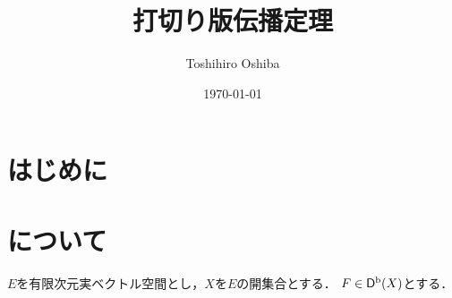 \newcommand{\mucat}[2][]{\mathsf{D}^{\mathrm{b}}_{#1}(#2)}

\newcommand{\conv}[1][]{\mathbin{\mathop{\circ}\limits_{#1}}}


\newcommand{\lopen}{\mathopen{]}}
\newcommand{\lclosed}{\mathopen{[}}
\newcommand{\ropen}{\mathclose{[}}
\newcommand{\rclosed}{\mathopen{]}}

\DeclarePairedDelimiter{\openintvl}{]}{[}     %
\DeclarePairedDelimiter{\closedintvl}{[}{]}       %
\DeclarePairedDelimiter{\lopenrclosedintvl}{]}{]}    %
\DeclarePairedDelimiter{\lcosedropenintvl}{[}{[}    %


\newcommand{\sm}{\raisebox{2.33pt}{~\rule{6.4pt}{1.3pt}~}}
\newcommand{\smi}{\smallsetminus}

\newcommand{\smid}{\mathrel{;}}

\newcommand{\hfun}[1][]{\mathcal{B}_{#1}}
\newcommand{\mfun}[1][]{\mathcal{C}_{#1}}
\newcommand{\mildhfun}[1][]{\widehat{\mathcal{B}}_{#1}}
\newcommand{\mildmfun}[1][]{\widehat{\mathcal{C}}_{#1}}

\newcommand{\micro}[1]{\mu_{#1}\hspace{0pt}}

\newcommand{\rrp}{\rr^{+}}
\newcommand{\Dbconic}{\mathop{\mathsf{D}^\mathrm{b}_{\rrp}}\nolimits}
\newcommand{\iu}{\sqrt{-1}}

\DeclareMathOperator{\WFa}{\mathrm{WF}_\mathrm{A}} %
\DeclareMathOperator{\WF}{\mathrm{WF}} %
\DeclareMathOperator{\SingSpec}{\mathrm{S}\text{.}\mathrm{S}\text{.}} %
\DeclareMathOperator{\SingSupp}{\mathrm{singsupp}} %
\newcommand{\Char}{\mathop{\mathrm{Char}}\nolimits}


\title{打切り版伝播定理}
\author{Toshihiro Oshiba}
\date{\today}

\maketitle
\section*{はじめに}
\section{{\cite[Theorem~5.2.1]{KS90}}について}
\(E\)を有限次元実ベクトル空間とし，\(X\)を\(E\)の開集合とする．
\(F\in\mathop{\mathsf{D}^\mathrm{b}}\nolimits(X)\)とする．

